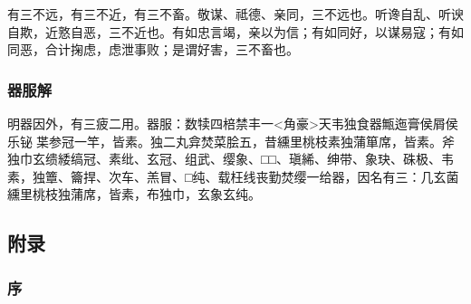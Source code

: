 \documentclass[]{article}
\begin{document}
有三不远，有三不近，有三不畜。敬谋、祗德、亲同，三不远也。听谗自乱、听谀自欺，近憝自恶，三不近也。有如忠言竭，亲以为信；有如同好，以谋易寇；有如同恶，合计掬虑，虑泄事败；是谓好害，三不畜也。

\hypertarget{header-n383}{%
\subsubsection{器服解}\label{header-n383}}

明器因外，有三疲二用。器服：数犊四棓禁丰一\textless{}角豪\textgreater{}天韦独食器甒迤膏侯屑侯乐铋枼参冠一竿，皆素。独二丸弇焚菜脍五，昔纁里桃枝素独蒲箪席，皆素。斧独巾玄缋緌缟冠、素纰、玄冠、组武、缨象、□□、瑱絺、绅带、象玦、硃极、韦素，独簟、籥捍、次车、羔冒、□纯、载枉线丧勤焚缨一给器，因名有三：几玄菌纁里桃枝独蒲席，皆素，布独巾，玄象玄纯。

\hypertarget{header-n391}{%
\subsection{附录}\label{header-n391}}

\hypertarget{header-n395}{%
\subsubsection{序}\label{header-n395}}
\end{document}
